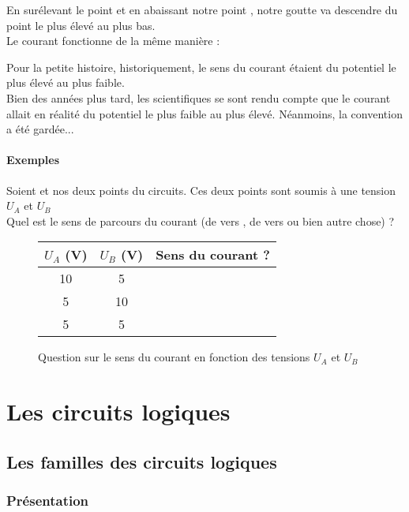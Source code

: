 En surélevant le point \A et en abaissant notre point \B, notre goutte va descendre du point le plus élevé au plus bas.\\

Le courant fonctionne de la même manière : \\


Pour la petite histoire, historiquement, le sens du courant étaient du potentiel le plus élevé au plus faible.\\
Bien des années plus tard, les scientifiques se sont rendu compte que le courant allait en réalité du
potentiel le plus faible au plus élevé. Néanmoins, la convention a été gardée...


\subsection{Exemples}
\begin{question}
Soient \A et \B nos deux points du circuits. Ces deux points sont soumis à une tension $U_A$ et $U_B$\\
Quel est le sens de parcours du courant (de \A vers \B, de \B vers \A ou bien autre chose) ?

\begin{figure}[!h]
    \centering
\begin{tabular}{|c|c|c|}
    \hline
    $U_A$ (V) & $U_B$ (V) & Sens du courant ?\\
    \hline
    10 & 5 & \\
    \hline
    5 & 10 & \\
    \hline
    5 & 5 &\\
    \hline
\end{tabular}
\caption{Question sur le sens du courant en fonction des tensions $U_A$ et $U_B$}
\end{figure}
\end{question}%
\part{Les circuits logiques}
\chapter{Les familles des circuits logiques}

\section{Présentation}

